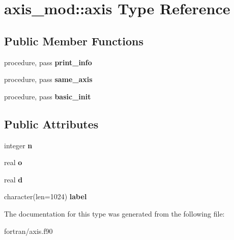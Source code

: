 \hypertarget{structaxis__mod_1_1axis}{}\section{axis\+\_\+mod\+:\+:axis Type Reference}
\label{structaxis__mod_1_1axis}
\subsection*{Public Member Functions}
\begin{DoxyCompactItemize}
\item 
\mbox{\label{structaxis__mod_1_1axis_a4b9c887a1e787242c660d5d959868428}} 
procedure, pass {\bfseries print\+\_\+info}
\item 
\mbox{\label{structaxis__mod_1_1axis_a521487d2c4fd52ceee8a583ceef6dea1}} 
procedure, pass {\bfseries same\+\_\+axis}
\item 
\mbox{\label{structaxis__mod_1_1axis_ac7519816da440d8b9e5936aad858adba}} 
procedure, pass {\bfseries basic\+\_\+init}
\end{DoxyCompactItemize}
\subsection*{Public Attributes}
\begin{DoxyCompactItemize}
\item 
\mbox{\label{structaxis__mod_1_1axis_aa78349ba99f9635d3c4feb4bcf938188}} 
integer {\bfseries n}
\item 
\mbox{\label{structaxis__mod_1_1axis_af8def67251477544b8916df119581dc2}} 
real {\bfseries o}
\item 
\mbox{\label{structaxis__mod_1_1axis_a7c4b5ea228995b0eee0ad59f938ac6a4}} 
real {\bfseries d}
\item 
\mbox{\label{structaxis__mod_1_1axis_ac93dab128152938a6c7d66b08a9b7937}} 
character(len=1024) {\bfseries label}
\end{DoxyCompactItemize}


The documentation for this type was generated from the following file\+:\begin{DoxyCompactItemize}
\item 
fortran/axis.\+f90\end{DoxyCompactItemize}
